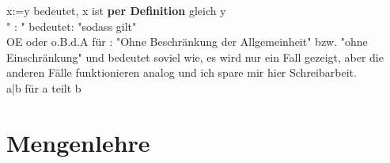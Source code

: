 \documentclass[headsepline,12pt,a4paper]{scrartcl}
\makeatletter
\def\myItem{%
   \@ifnextchar[ \@myItem{\@noitemargtrue\@myItem[\@itemlabel]}}
\def\@myItem[#1]{\item[#1]\mbox{}\\}
\makeatother
\begin{document}
\begin{itemize}
\newpage

\myItem[Misc]
x:=y bedeutet, x ist \textbf{per Definition} gleich y \\
" : " bedeutet: "sodass gilt" \\
OE oder o.B.d.A für : "Ohne Beschränkung der Allgemeinheit" bzw. "ohne Einschränkung" und bedeutet soviel wie, es wird nur ein Fall gezeigt, aber die anderen Fälle funktionieren analog und ich spare mir hier Schreibarbeit. \\

a|b für a teilt b \\


\end{itemize}

\section*{Mengenlehre}
\end{document}
